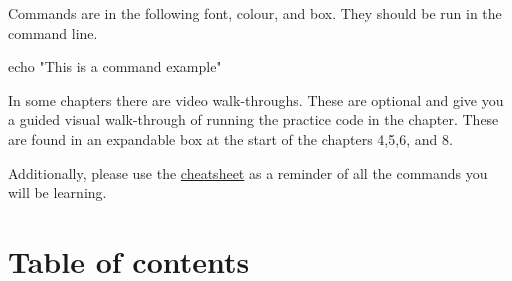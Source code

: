 \documentclass[
  letterpaper,
  DIV=11,
  numbers=noendperiod]{scrreprt}
\newenvironment{Shaded}{\begin{snugshade}}{\end{snugshade}}
\newcommand{\BuiltInTok}[1]{\textcolor[rgb]{0.00,0.23,0.31}{#1}}
\newcommand{\StringTok}[1]{\textcolor[rgb]{0.13,0.47,0.30}{#1}}
\begin{document}
Commands are in the following font, colour, and box. They should be run
in the command line.

\begin{Shaded}
\begin{Highlighting}[]
\BuiltInTok{echo} \StringTok{"This is a command example"} 
\end{Highlighting}
\end{Shaded}

In some chapters there are video walk-throughs. These are optional and
give you a guided visual walk-through of running the practice code in
the chapter. These are found in an expandable box at the start of the
chapters 4,5,6, and 8.

Additionally, please use the \hyperref[cheatsheet]{cheatsheet} as a
reminder of all the commands you will be learning.

\section*{Table of contents}\label{table-of-contents}

\end{document}
